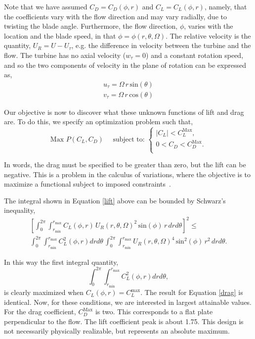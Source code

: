Note that we have assumed $C_D = C_D(\phi,r)$ and $C_L = C_L(\phi,r)$,
namely, that the coefficients vary with the flow direction and may vary
radially, due to twisting the blade angle. Furthermore, the flow
direction, $\phi$, varies with the location and the blade speed,
in that $\phi=\phi(r,\theta,\Omega)$. The relative velocity is the
quantity, $U_R = U - U_\tau$, e.g. the difference in velocity between
the turbine and the flow. The turbine has no axial velocity ($w_\tau =
0$) and a constant rotation speed, and so the two components of velocity
in the plane of rotation can be expressed as,
\begin{align}
 u_\tau = \Omega \,r\, \text{sin}(\theta)\\
 v_\tau = \Omega \,r\, \text{cos}(\theta)
\end{align}

Our objective is now to discover what these unknown functions of lift
and drag are. To do this, we specify an optimization problem such that, 
\begin{equation*} 
 \text{Max } P(C_L,C_D) \quad \text{ subject to: }
  \begin{cases}
   |C_L| < C_L^{\text{Max}}, \\
   0 < C_D < C_D^{\text{Max}}. \\
  \end{cases}
\end{equation*}

In words, the drag must be specified to be greater than zero, but
the lift can be negative. This is a problem in the calculus of
variations, where the objective is to maximize a
functional subject to imposed
constraints~\cite{thornton2004classical,bradbury1968theoretical,2015JFM...784..565S}.   

%
%
The integral shown in Equation \ref{lift} above can be bounded by 
Schwarz's inequality,  
\begin{align*}
  \left[
    \int_0^{2\pi}
    \int_{r_{\text{min}}}^{r_{\text{max}}} C_L(\phi,r)\, U_R(r,\theta,\Omega)^2
 \,\text{sin}(\phi)\, r\,dr d\theta \right]^2 \le \\
  \int_0^{2\pi} \int_{r_{\text{min}}}^{r_{\text{max}}} C_L^2(\phi,r) dr d\theta\,
  \int_0^{2\pi} \int_{r_{\text{min}}}^{r_{\text{max}}} U_R(r,\theta,\Omega)^4 
 \,\text{sin}^2(\phi)\, r^2\,dr d\theta.
\end{align*}

In this way the first integral quantity,
\begin{equation}
  \int_0^{2\pi}
 \int_{r_{\text{min}}}^{r_{\text{max}}} C_L^2(\phi,r) dr d\theta, 
\end{equation}
is clearly maximized when $C_L(\phi,r) = C_L^{\text{max}}$. 
The result for Equation \ref{drag} is identical. Now, for these
conditions, we are interested in largest attainable values. For the drag
coefficient, $C_D^{\text{Max}}$ is two. %
This corresponds to a flat plate perpendicular to the flow.
The lift coefficient peak is about 1.75. This design is not necessarily
physically realizable, but represents an absolute maximum. 

